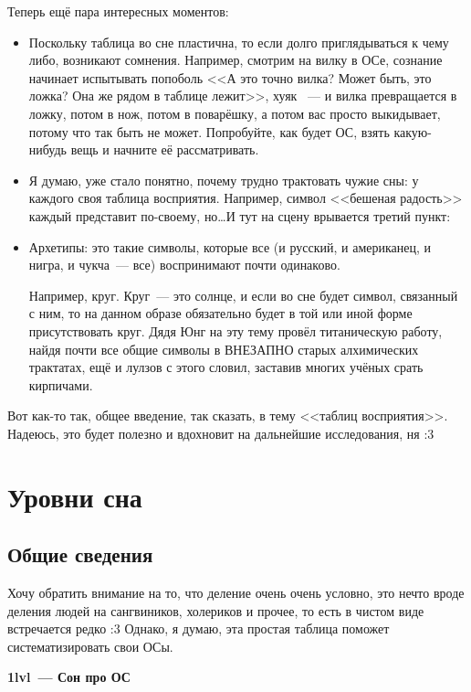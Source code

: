 \documentclass[a4paper,14pt,oneside]{memoir}
\begin{document}
Теперь ещё пара интересных моментов:
\begin{itemize}
\item Поскольку таблица во сне пластична, то если долго приглядываться к чему либо, возникают сомнения. Например, смотрим на вилку в ОСе, сознание начинает испытывать попоболь <<А это точно вилка? Может быть, это ложка? Она же рядом в таблице лежит>>, хуяк ~--- и вилка превращается в ложку, потом в нож, потом в поварёшку, а потом вас просто выкидывает, потому что так быть не может. Попробуйте, как будет ОС, взять какую-нибудь вещь и начните её рассматривать. 
\item Я думаю, уже стало понятно, почему трудно трактовать чужие сны: у каждого своя таблица восприятия. Например, символ <<бешеная радость>> каждый представит по-своему, но\ldots И тут на сцену врывается третий пункт:
\item Архетипы: это такие символы, которые все (и русский, и американец, и нигра, и чукча~--- все) воспринимают почти одинаково.
 
Например, круг. Круг~--- это солнце, и если во сне будет символ, связанный с ним, то на данном образе обязательно будет в той или иной форме присутствовать круг. Дядя Юнг на эту тему провёл титаническую работу, найдя почти все общие символы в ВНЕЗАПНО старых алхимических трактатах, ещё и лулзов с этого словил, заставив многих учёных срать кирпичами.
\end{itemize}

Вот как-то так, общее введение, так сказать, в тему <<таблиц восприятия>>. Надеюсь, это будет полезно и вдохновит на дальнейшие исследования, ня :3 



\chapter{Уровни сна}


\section{Общие сведения}
Хочу обратить внимание на то, что деление очень очень условно, это нечто вроде деления людей на сангвиников, холериков и прочее, то есть в чистом виде встречается редко :3 Однако, я думаю, эта простая таблица поможет систематизировать свои ОСы.


\begin{center}
\textbf{1lvl~--- Сон про ОС}
\end{center}
\end{document}

